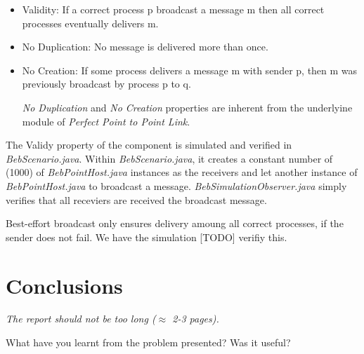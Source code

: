 \documentclass[a4paper, 11pt]{article}
\begin{document}
\begin{itemize}
	
	\item Validity: If a correct process p broadcast a message m then all correct processes eventually delivers m.
		
	\item No Duplication: No message is delivered more than once.
		
	\item No Creation: If some process delivers a message m with sender p, then m was previously broadcast by process p to q.

\textit{No Duplication} and \textit{No Creation} properties are inherent from the underlyine module of 	\textit{Perfect Point to Point Link}.
\end{itemize}

The Validy property of the component is simulated and verified in \textit{BebScenario.java}. Within \textit{BebScenario.java}, it creates a constant number of (1000) of \textit{BebPointHost.java} instances as the receivers and let another instance of \textit{BebPointHost.java} to broadcast a message. \textit{BebSimulationObserver.java} simply verifies that all receviers are received the broadcast message.

Best-effort broadcast only ensures delivery amoung all correct processes, if the sender does not fail. We have the simulation [TODO] verifiy this.


\section{Conclusions}

\textit{The report should not be too long ($\approx$
  2-3 pages).}

What have you learnt from the problem presented?
Was it useful?
\end{document}
